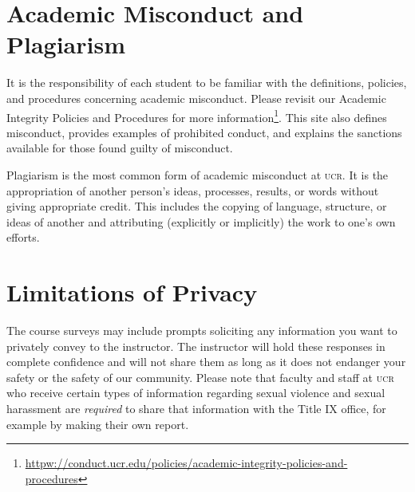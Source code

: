 \documentclass[12pt]{article}
\newcommand{\acro}[1]{\textsc{\MakeLowercase{#1}}}
\numberwithin{equation}{section}    %
\begin{document}
\section*{Academic Misconduct and Plagiarism}

It is the responsibility of each student to be familiar with the definitions, policies, and procedures concerning academic misconduct. Please revisit our Academic Integrity Policies and Procedures for more information\footnote{\url{httpw://conduct.ucr.edu/policies/academic-integrity-policies-and-procedures}}. This site also defines misconduct, provides examples of prohibited conduct, and explains the sanctions available for those found guilty of misconduct.

Plagiarism is the most common form of academic misconduct at \acro{UCR}. It is the appropriation of another person's ideas, processes, results, or words without giving appropriate credit. This includes the copying of language, structure, or ideas of another and attributing (explicitly or implicitly) the work to one's own efforts. 

\section*{Limitations of Privacy}

The course surveys may include prompts soliciting any information you want to privately convey to the instructor. The instructor will hold these responses in complete confidence and will not share them as long as it does not endanger your safety or the safety of our community. Please note that faculty and staff at \acro{UCR} who receive certain types of information regarding sexual violence and sexual harassment are \emph{required} to share that information with the Title IX office, for example by making their own report. 
\end{document}
